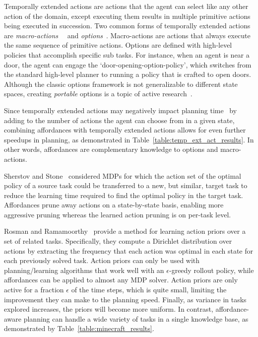 \documentclass[letterpaper]{article}
\begin{document}
Temporally extended actions are actions that the agent can select like
any other action of the domain, except executing them results in
multiple primitive actions being executed in succession. Two common
forms of temporally extended actions are {\em
  macro-actions}~\cite{hauskrecht98} ~and {\em
  options}~\cite{sutton99}.  Macro-actions are actions that always
execute the same sequence of primitive actions. Options are defined
with high-level policies that accomplish specific sub tasks. For
instance, when an agent is near a door, the agent can engage the
`door-opening-option-policy', which switches from the standard
high-level planner to running a policy that is crafted to open doors.
Although the classic options framework is not generalizable to
different state spaces, creating {\em portable} options is a topic of
active
research~\cite{konidaris07,konidaris2009efficient,Ravindran03analgebraic,croonenborghs2008learning,andre2002state,konidaris2012transfer}.

Since temporally extended actions may negatively impact planning
time~\cite{Jong:2008zr} by adding to the number of actions the agent
can choose from in a given state, combining affordances with
temporally extended actions allows for even further speedups in
planning, as demonstrated in Table~\ref{table:temp_ext_act_results}. In
other words, affordances are complementary knowledge to options and
macro-actions.

Sherstov and Stone~\cite{sherstov2005improving} considered MDPs for
which the action set of the optimal policy of a source task could be
transferred to a new, but similar, target task to reduce the learning
time required to find the optimal policy in the target task.
Affordances prune away actions on a state-by-state basis, enabling
more aggressive pruning whereas the learned action pruning is on per-task
level.

Rosman and Ramamoorthy~\cite{rosman2012good} provide a method for
learning action priors over a set of related tasks. Specifically, they
compute a Dirichlet distribution over actions by extracting the
frequency that each action was optimal in each state for each
previously solved task.  Action priors can only be used with
planning/learning algorithms that work well with an $\epsilon$-greedy
rollout policy, while affordances can be applied to almost any MDP
solver.  Action priors are only active for a fraction $\epsilon$ of
the time steps, which is quite small, limiting the improvement they
can make to the planning speed.  Finally, as variance in tasks
explored increases, the priors will become more uniform. In contrast,
affordance-aware planning can handle a wide variety of tasks in a
single knowledge base, as demonstrated by
Table~\ref{table:minecraft_results}.
\end{document}
